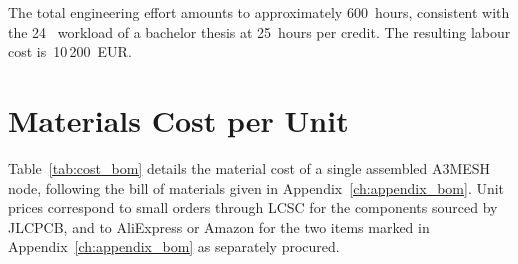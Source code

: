 \documentclass[english,bachelor]{tfgitic}[2026/01/22]
\begin{document}
The total engineering effort amounts to approximately 600~hours, consistent with the 24~ workload of a bachelor thesis at 25~hours per credit. The resulting labour cost is~10\,200~EUR.

\section{Materials Cost per Unit}
\label{sec:cost_materials}

Table~\ref{tab:cost_bom} details the material cost of a single assembled A3MESH node, following the bill of materials given in Appendix~\ref{ch:appendix_bom}. Unit prices correspond to small orders through LCSC for the components sourced by JLCPCB, and to AliExpress or Amazon for the two items marked in Appendix~\ref{ch:appendix_bom} as separately procured.
\end{document}
